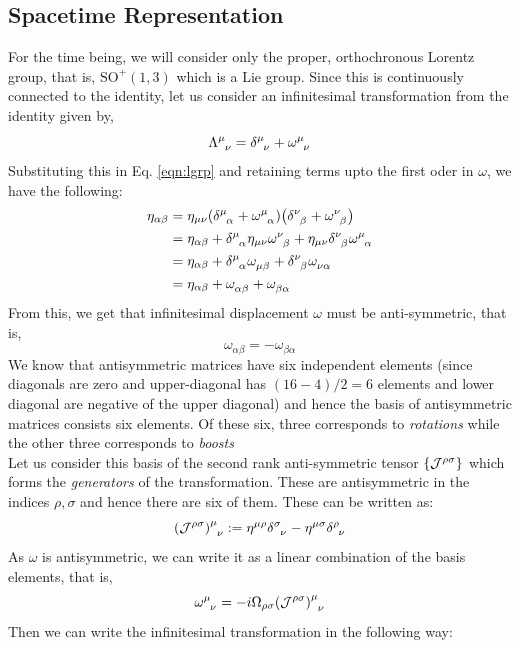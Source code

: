 \subsection{Spacetime Representation}
For the time being, we will consider only the proper, orthochronous Lorentz group, that is, $\mathrm{SO}^+(1,3)$ which is a Lie group. Since this is continuously connected to the identity, let us consider an infinitesimal transformation from the identity given by,
$$\trmat{\mu}{\nu} = \delt{\mu}{\nu}+\tensor{\omega}{^\mu _\nu}$$
Substituting this in Eq. \ref{eqn:lgrp} and retaining terms upto the first oder in $\omega$, we have the following:
\begin{align*}
    \eta_{\alpha \beta} &= \eta_{\mu\nu} \qty(\delt{\mu}{\alpha} + \tensor{\omega}{^\mu _\alpha})\qty(\delt{\nu}{\beta} + \tensor{\omega}{^\nu _\beta})\\
    &=\eta_{\alpha\beta} + \delt{\mu}{\alpha}\eta_{\mu\nu}\tensor{\omega}{^\nu _\beta} + \eta_{\mu\nu}\delt{\nu}{\beta} \tensor{\omega}{^\mu _\alpha}\\
    &=\eta_{\alpha\beta} + \delt{\mu}{\alpha}\tensor{\omega}{_\mu _\beta} + \delt{\nu}{\beta} \tensor{\omega}{_\nu _\alpha}\\
    &=\eta_{\alpha\beta} + \tensor{\omega}{_\alpha _\beta} +  \tensor{\omega}{_\beta _\alpha}
\end{align*}
From this, we get that infinitesimal displacement $\omega$ must be anti-symmetric, that is, 
$$\boxed{\omega_{\alpha\beta} = -\omega_{\beta\alpha}}$$
We know that antisymmetric matrices have six independent elements (since diagonals are zero and upper-diagonal has $(16-4)/2 = 6$ elements and lower diagonal are negative of the upper diagonal) and hence the basis of antisymmetric matrices consists six elements. Of these six, three corresponds to \textit{rotations} while the other three corresponds to \textit{boosts}\\[0.2cm] Let us consider this basis of the second rank anti-symmetric tensor $\{\mathcal J^{\rho\sigma}\}$ which forms the \textit{generators} of the transformation. These are antisymmetric in the indices $\rho, \sigma$ and hence there are six of them. These can be written as:
$$\tensor{{\qty(\SJ^{\rho\sigma})}}{^\mu _\nu} := \eta^{\mu\rho} \tensor{\delta}{^\sigma _\nu} - \eta^{\mu\sigma} \tensor{\delta}{^\rho _\nu}$$
As $\omega$ is antisymmetric, we can write it as a linear combination of the basis elements, that is, 
$$\tensor{\omega}{^\mu _\nu} =-i \Omega_{\rho\sigma}\tensor{{\qty(\SJ^{\rho\sigma})}}{^\mu _\nu}$$
Then we can write the infinitesimal transformation in the following way:

